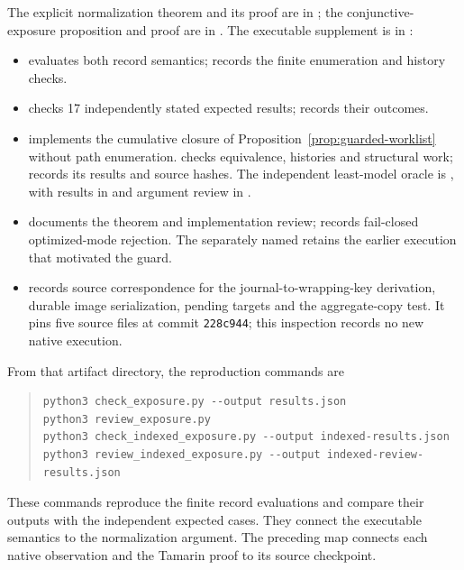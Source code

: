\documentclass[pdflatex]{sn-jnl}
\theoremstyle{thmstyleone}
\theoremstyle{thmstylethree}
\theoremstyle{thmstyletwo}
\begin{document}
The explicit normalization theorem and its proof are in
; the conjunctive-exposure proposition and proof
are in . The executable supplement is in
:
\begin{itemize}
\item {} evaluates both record semantics;
 records the finite enumeration and history checks.
\item {} checks 17 independently stated expected
results;  records their outcomes.
\item {} implements the cumulative closure of
Proposition~\ref{prop:guarded-worklist} without path enumeration.
 checks equivalence, histories and structural
work;  records its results and source hashes.
The independent least-model oracle is ,
with results in  and argument review in
.
\item {} documents the theorem and implementation review;
 records fail-closed optimized-mode
rejection. The separately named
 retains the earlier execution
that motivated the guard.
\item {} records source correspondence for the
journal-to-wrapping-key derivation, durable image serialization, pending
targets and the aggregate-copy test. It pins five source files
at commit \texttt{228c944}; this inspection records no new native execution.
\end{itemize}
From that artifact directory, the reproduction commands are
\begin{quote}
\small
\begin{verbatim}
python3 check_exposure.py --output results.json
python3 review_exposure.py
python3 check_indexed_exposure.py --output indexed-results.json
python3 review_indexed_exposure.py --output indexed-review-results.json
\end{verbatim}
\end{quote}
These commands reproduce the finite record evaluations and compare their
outputs with the independent expected cases. They connect the executable
semantics to the normalization argument. The preceding map connects
each native observation and the Tamarin proof to its source checkpoint.
\end{document}

